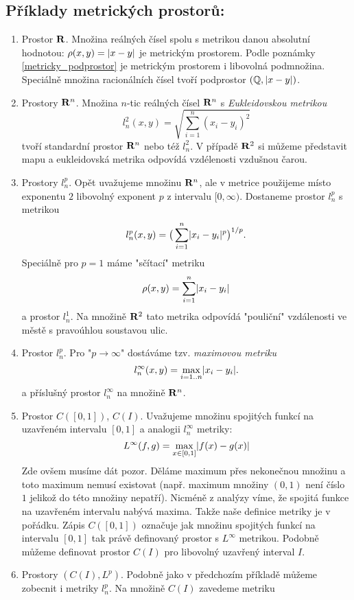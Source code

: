   \subsection{Příklady metrických prostorů:}
  \begin{enumerate}
    \item Prostor ${\rm\bf R}$. Množina reálných čísel spolu s metrikou danou absolutní hodnotou: $\rho(x,y)=\lvert x-y\rvert$ je metrickým prostorem.
        Podle poznámky \ref{metricky_podprostor} je metrickým prostorem i libovolná podmnožina. Speciálně množina racionálních čísel 
        tvoří podprostor $({\mathbb{Q}},\lvert x-y\rvert)$.
    \item Prostory ${\rm\bf R}^n$. Množina $n$-tic reálných čísel ${\rm\bf R}^n$ s {\it Eukleidovskou metrikou}
  \[
     l_n^2(x,y) = \sqrt{\sum_{i=1}^{n} (x_i-y_i)^2} 
  \]
  tvoří standardní prostor ${\rm\bf R}^n$ nebo též $l_n^2$. V případě ${\rm\bf R}^2$ si můžeme představit mapu a 
  eukleidovská metrika odpovídá vzdélenosti vzdušnou čarou. 
  \item Prostory $l^p_n$. Opět uvažujeme množinu ${\rm\bf R}^n$, ale v metrice použijeme místo exponentu $2$ libovolný exponent $p$ z intervalu $[0,\infty)$.
  Dostaneme prostor $l_n^p$ s metrikou
  \[
        l_n^p(x,y) = \big(\sum_{i=1}^{n} \lvert x_i-y_i\rvert^p\big)^{1/p}. 
  \]
  Speciálně pro $p=1$ máme "sčítací" metriku
  \[
     \rho(x,y) = \sum_{i=1}^{n} \lvert x_i-y_i\rvert 
  \]
  a prostor $l_n^1$. Na množině ${\rm\bf R}^2$ tato metrika odpovídá "pouliční" vzdálenosti ve městě s pravoúhlou soustavou ulic.
  \item Prostor $l_n^p$. Pro "$p\to \infty$" dostáváme tzv. {\it maximovou metriku}
  \[
     l_n^\infty(x,y) = \max_{i=1..n} \lvert x_i-y_i\rvert.
  \]
  a příslušný prostor $l^\infty_n$ na množině ${\rm\bf R}^n$. 
  \item Prostor $C([0,1])$, $C(I)$. Uvažujeme množinu spojitých funkcí na uzavřeném intervalu $[0,1]$ a analogii $l_n^\infty$ metriky:
        \[
          L^\infty(f,g)=\max_{x\in[0,1]} \lvert f(x)-g(x)\rvert
        \]
        Zde ovšem musíme dát pozor. Děláme maximum přes nekonečnou množinu a toto maximum nemusí existovat (např. maximum množiny $(0,1)$ není 
        číslo $1$ jelikož do této množiny nepatří). Nicméně z analýzy víme, že spojitá funkce na uzavřeném intervalu nabývá maxima. Takže naše definice
        metriky je v pořádku. Zápis $C([0,1])$ označuje jak množinu spojitých funkcí na intervalu $[0,1]$ tak právě definovaný prostor s $L^\infty$
        metrikou. Podobně můžeme definovat prostor $C(I)$ pro libovolný uzavřený interval $I$.
  \item Prostory $( C(I), L^p )$. Podobně jako v předchozím příkladě můžeme zobecnit i metriky $l_n^p$. Na množině $C(I)$ zavedeme metriku

\end{enumerate}
